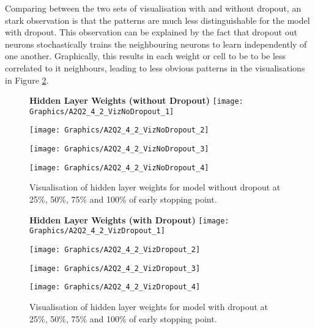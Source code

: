 \documentclass[a4paper,12pt]{article}
\begin{document}
Comparing between the two sets of visualisation with and without dropout, an stark observation is that the patterns are much less distinguishable for the model with dropout. This observation can be explained by the fact that dropout out neurons stochastically trains the neighbouring neurons to learn independently of one another. Graphically, this results in each weight or cell to be to be less correlated to it neighbours, leading to less obvious patterns in the visualisations in Figure \ref{figure:VizDropout}.

\begin{figure}[!htb]
\centering
\textbf{Hidden Layer Weights (without Dropout)}
\vspace{1em}
\texttt{[image: Graphics/A2Q2\_4\_2\_VizNoDropout\_1]}
\end{figure}

\begin{figure}[!htb]
\centering
\texttt{[image: Graphics/A2Q2\_4\_2\_VizNoDropout\_2]}
\end{figure}

\begin{figure}[!htb]
\centering
\texttt{[image: Graphics/A2Q2\_4\_2\_VizNoDropout\_3]}
\end{figure}

\begin{figure}[!htb]
\centering
\texttt{[image: Graphics/A2Q2\_4\_2\_VizNoDropout\_4]}
\caption{\label{figure:VizNoDropout} Visualisation of hidden layer weights for model without dropout at 25\%, 50\%, 75\% and 100\% of early stopping point.}
\end{figure}

\begin{figure}[!htb]
\centering
\textbf{Hidden Layer Weights (with Dropout)}
\vspace{1em}
\texttt{[image: Graphics/A2Q2\_4\_2\_VizDropout\_1]}
\end{figure}

\begin{figure}[!htb]
\centering
\texttt{[image: Graphics/A2Q2\_4\_2\_VizDropout\_2]}
\end{figure}

\begin{figure}[!htb]
\centering
\texttt{[image: Graphics/A2Q2\_4\_2\_VizDropout\_3]}
\end{figure}

\begin{figure}[!htb]
\centering
\texttt{[image: Graphics/A2Q2\_4\_2\_VizDropout\_4]}
\caption{\label{figure:VizDropout} Visualisation of hidden layer weights for model with dropout at 25\%, 50\%, 75\% and 100\% of early stopping point.}
\end{figure}
\end{document}
